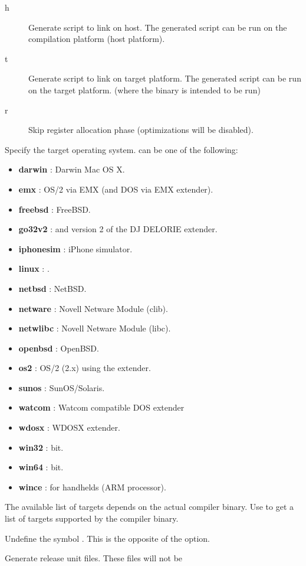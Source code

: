 \begin{description}
\begin{description}
\item[h] Generate script to link on host. The generated script can be run on
the compilation platform (host platform).
\item[t] Generate script to link on target platform. The generated script
can be run on the target platform. (where the binary is intended to be run)
\item[r] Skip register allocation phase (optimizations will be disabled).
\end{description}
\item[-Txxx]  Specify the target operating system.  can be one of
the following:
\begin{itemize}
\item \textbf{darwin} : Darwin Mac OS X.
\item \textbf{emx} : OS/2 via EMX (and DOS via EMX extender).
\item \textbf{freebsd} : FreeBSD.
\item \textbf{go32v2} : \dos and version 2 of the DJ DELORIE extender.
\item \textbf{iphonesim} : iPhone simulator.
\item \textbf{linux} : \linux.
\item \textbf{netbsd} : NetBSD.
\item \textbf{netware} : Novell Netware Module (clib).
\item \textbf{netwlibc} : Novell Netware Module (libc).
\item \textbf{openbsd} : OpenBSD.
\item \textbf{os2} : OS/2 (2.x) using the  extender.
\item \textbf{sunos} : SunOS/Solaris.
\item \textbf{watcom} : Watcom compatible DOS extender
\item \textbf{wdosx} : WDOSX extender.
\item \textbf{win32} :  bit.
\item \textbf{win64} :  bit.
\item \textbf{wince} : \windows for handhelds (ARM processor).
\end{itemize}
The available list of targets depends on the actual compiler binary.
Use  to get a list of targets supported by the compiler binary.
\item [-uxxx]  Undefine the symbol . This is the opposite
of the  option.
\item [-Ur]  Generate release unit files. These files will not be

\end{description}

